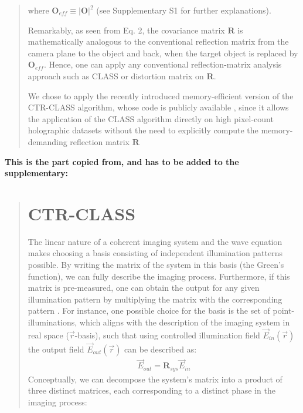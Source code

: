 \documentclass[12pt]{article}
\newenvironment{ourresponse}
    {\begin{tcolorbox}[width=\linewidth,breakable,enhanced,colback=gray!5,colframe=responsecolor!50,title=Response,left=5pt,right=5pt]}
    {\end{tcolorbox}}
\begin{document}
\begin{enumerate}[label=\arabic*.]
\begin{ourresponse}
\begin{quote}
            where $\bm{O}_{eff} \equiv |\bm{O}|^2$ (see Supplementary S1 for further explanations). 
            
            Remarkably, as seen from Eq. 2, the covariance matrix $\bm{R}$ is mathematically analogous to the conventional reflection matrix from the camera plane to the object and back, when the target object is replaced by $\bm{O}_{eff}$. Hence, one can apply any conventional reflection-matrix analysis approach such as CLASS \cite{kang17,lee22} or distortion matrix \cite{badon2020distortion} on $\bm{R}$.
            
            We chose to apply the recently introduced memory-efficient version of the CTR-CLASS algorithm, whose code is publicly available \cite{weinberg2023noninvasive}, since it allows the application of the CLASS algorithm directly on high pixel-count holographic datasets without the need to explicitly compute the memory-demanding reflection matrix $\bm{R}$
 
        \end{quote}

        \textbf{This is the part copied from, and has to be added to the supplementary:}
        \begin{quote}
            \section{CTR-CLASS}

            The linear nature of a coherent imaging system and the wave equation makes choosing a basis consisting of independent illumination patterns possible. By writing the matrix of the system in this basis (the Green's function), we can fully describe the imaging process. Furthermore, if this matrix is pre-measured, one can obtain the output for any given illumination pattern by multiplying the matrix with the corresponding pattern \cite{popoff2010measuring}.
            For instance, one possible choice for the basis is the set of point-illuminations, which aligns with the description of the imaging system in real space ($\vec{r}$-basis), such that using controlled illumination field $\vec{E}_{in} (\vec{r})$ the output field ${\vec{E}_{out}}(\vec{r})$ can be described as:
            \begin{eqnarray}
            \vec{E}_{out} = \bm{R}_{sys}\vec{E}_{in}
            \label{eq:1}
            \end{eqnarray}
            Conceptually, we can decompose the system's matrix into a product of three distinct matrices, each corresponding to a distinct phase in the imaging process:
            

\end{quote}
\end{ourresponse}
\end{enumerate}
\end{document}
